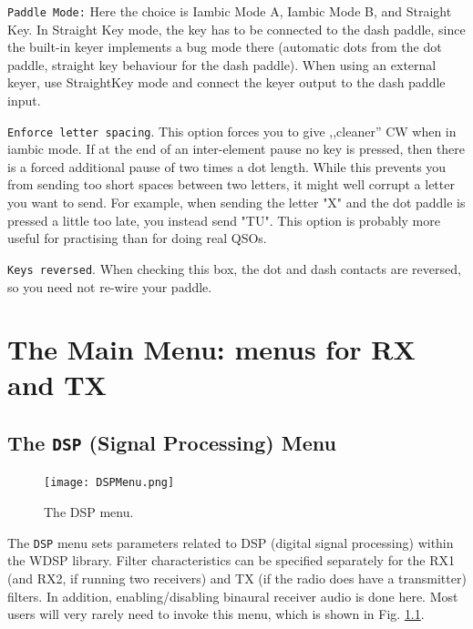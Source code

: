\documentclass[12pt]{book}
\def\rett#1{\texttt{\color{red}#1}}
\def\bltt#1{\texttt{\color{blue}#1}}
\begin{document}
\rett{Paddle Mode:} Here the choice is Iambic Mode A, Iambic Mode B,
and  Straight Key. In Straight Key mode, the key has to be connected
to the dash paddle, since the built-in keyer implements a bug mode
there (automatic dots from the dot paddle, straight key behaviour
for the dash paddle). When using an external keyer, use StraightKey
mode and connect the keyer output to the dash paddle input.

\rett{Enforce letter spacing}. This option forces you to give ,,cleaner'' CW
when in iambic mode. If at the end of an inter-element pause no key is
pressed, then there is a forced additional pause of two times a dot length. While this
prevents you from sending too short spaces between two letters, it
might well corrupt a letter you want to send. For example, when sending
the letter "X" and the dot paddle is pressed a little too late, you
instead send "TU". This option is probably more useful for practising than
for doing real QSOs.

\rett{Keys reversed}. When checking this box, the dot and dash contacts
are reversed, so you need not re-wire your paddle.


\chapter[Menus for RX and TX]{The Main Menu: menus for RX and TX}

\section{The \texttt{DSP} (Signal Processing) Menu}

\begin{figure}[ht]
\center
\texttt{[image: DSPMenu.png]}
\caption{The DSP menu.}
\label{fig:DSPMenu}
\end{figure}

The \bltt{DSP} menu sets parameters related to DSP (digital signal processing)
within the WDSP library.
Filter characteristics can be specified separately for the RX1 (and RX2, if
running two receivers) and TX (if the radio does have a transmitter)
filters. In addition, enabling/disabling binaural receiver audio
is done here.  Most users will
very rarely need to invoke this menu, which is shown
in Fig. \ref{fig:DSPMenu}.
\end{document}
